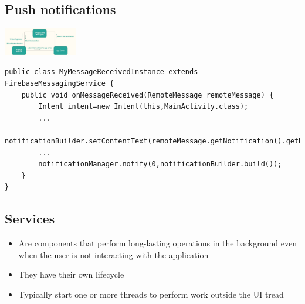 \subsection{Push notifications}

\begin{breakbox}
\includegraphics[width=0.24\textwidth]{figures/pushNotificationFlow.png}
\end{breakbox}

\begin{breakbox}

\begin{lstlisting}
public class MyMessageReceivedInstance extends FirebaseMessagingService {
    public void onMessageReceived(RemoteMessage remoteMessage) {
        Intent intent=new Intent(this,MainActivity.class);
        ...
        notificationBuilder.setContentText(remoteMessage.getNotification().getBody());
        ...
        notificationManager.notify(0,notificationBuilder.build());
    }
}
\end{lstlisting}
\end{breakbox}


\subsection{Services}

\begin{breakbox}
\begin{itemize}
\tightlist
\item
  Are components that perform long-lasting operations in the background
  even when the user is not interacting with the application
\item
  They have their own lifecycle
\item
  Typically start one or more threads to perform work outside the UI
  tread
\end{itemize}
\end{breakbox}

